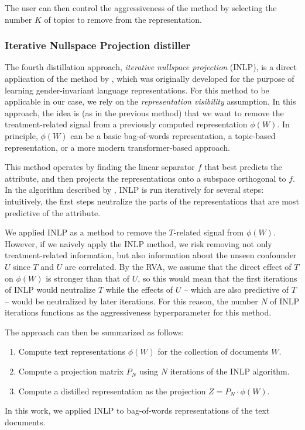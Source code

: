 \documentclass[11pt]{article}
\begin{document}
The user can then control the aggressiveness of the method by selecting the number $K$ of topics to remove from the representation.

\subsubsection{Iterative Nullspace Projection distiller}

The fourth distillation approach, \emph{iterative nullspace projection} (INLP), is a direct application of the method by \citet{ravfogel2020}, which was originally developed for the purpose of learning gender-invariant language representations.
For this method to be applicable in our case, we rely on the \emph{representation visibility} assumption.
In this approach, the idea is (as in the previous method) that we want to remove the treatment-related signal from a previously computed representation $\phi(W)$. In principle, $\phi(W)$ can be a basic bag-of-words representation, a topic-based representation, or a more modern transformer-based approach.

This method operates by finding the linear separator $f$ that best predicts the attribute, and then projects the representations onto a subspace orthogonal to $f$.
In the algorithm described by \citet{ravfogel2020}, INLP is run iteratively for several steps: intuitively, the first steps neutralize the parts of the representations that are most predictive of the attribute.

We applied INLP as a method to remove the $T$-related signal from $\phi(W)$.
%
However, if we naively apply the INLP method, we risk removing not only treatment-related information, but also information about the unseen confounder $U$ since $T$ and $U$ are correlated.
%
By the RVA, we assume that the direct effect of $T$ on $\phi(W)$ is stronger than that of $U$, so this would mean that the first iterations of INLP would neutralize $T$ while the effects of $U$ -- which are also predictive of $T$ -- would be neutralized by later iterations.
%
For this reason, the number $N$ of INLP iterations functions as the aggressiveness hyperparameter for this method.

The approach can then be summarized as follows:
\begin{enumerate}%
    \item Compute text representations $\phi(W)$ for the collection of documents $W$.
    \item Compute a projection matrix $P_N$ using $N$ iterations of the INLP algorithm.
    \item Compute a distilled representation as the projection $Z = P_N \cdot \phi(W)$.
\end{enumerate}
In this work, we applied INLP to bag-of-words representations of the text documents.
\end{document}

